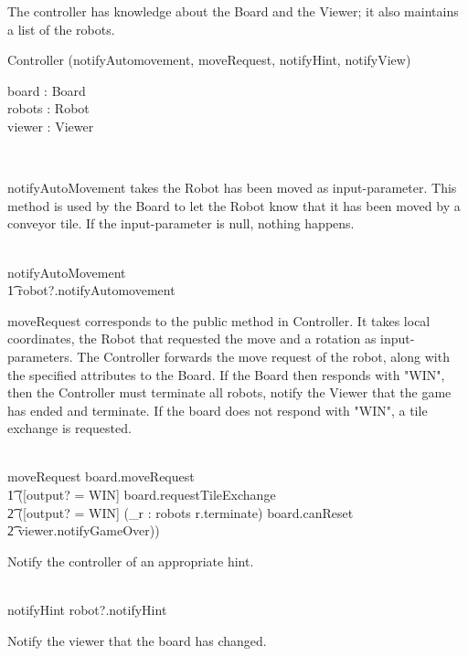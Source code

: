\documentclass[12pt]{article}
\begin{document}
The controller has knowledge about the Board and the Viewer; it also maintains a list of the robots.
\begin{class}{Controller}
\upharpoonright (notifyAutomovement, moveRequest, notifyHint, notifyView) \\
\begin{state}
board : Board \\
robots : \power Robot \\
viewer : Viewer
\end{state}\\
\begin{zpar}
notifyAutoMovement takes the Robot has been moved as input-parameter. This method is used by the Board to let the Robot know that it has been moved by a conveyor tile. If the input-parameter is null, nothing happens.
\end{zpar} \\
notifyAutoMovement  \;\; [] \\\t1 robot?.notifyAutomovement \\
\znewpage
\begin{zpar}
moveRequest corresponds to the public method in Controller. It takes local coordinates, the Robot that requested the move and a rotation as input-parameters. The Controller forwards the move request of the robot, along with the specified attributes to the Board. If the Board then responds with "WIN", then the Controller must terminate all robots, notify the Viewer that the game has ended and terminate. If the board does not respond with "WIN", a tile exchange is requested.
\end{zpar} \\
moveRequest \sdef board.moveRequest \; \; \comp \\ \t1 ([output? \not = WIN] \wedge board.requestTileExchange \; \; [] \\ \t2 ([output? = WIN] \wedge (\bigwedge_{r : robots} r.terminate) \wedge board.canReset \; \; \wedge \\ \t2 viewer.notifyGameOver)) \\
\begin{zpar}
Notify the controller of an appropriate hint.
\end{zpar} \\
notifyHint \sdef robot?.notifyHint \\
\begin{zpar}
Notify the viewer that the board has changed.
\end{zpar} \\

\end{class}
\end{document}

